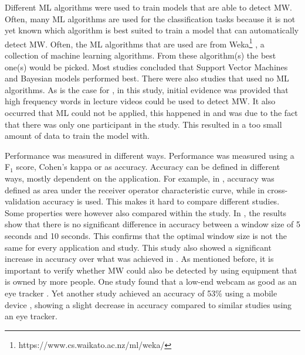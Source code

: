 Different ML algorithms were used to train models that are able to detect MW. Often, many ML algorithms are used for the classification tasks because it is not yet known which algorithm is best suited to train a model that can automatically detect MW. Often, the ML algorithms that are used are from Weka\footnote{https://www.cs.waikato.ac.nz/ml/weka/} \cite{Bixler2015AutomaticPhysiology}\cite{Bixler2015AutomaticAwareness}\cite{Bixler2016AutomaticReadingd}\cite{Bixler2014TowardWanderingd}\cite{Blanchard2014AutomatedLearning}\cite{Gwizdka2019ExploringTasks}\cite{Hutt2017OutClassroom}\cite{Pham2015Attentivelearner:Tracking}, a collection of machine learning algorithms. From these algorithm(s) the best one(s) would be picked. Most studies concluded that Support Vector Machines and Bayesian models performed best. There were also studies that used no ML algorithms. As is the case for \cite{Jo2017AMind}, in this study, initial evidence was provided that high frequency words in lecture videos could be used to detect MW. It also occurred that ML could not be applied, this happened in \cite{Gontier2016HowEnvironment} and was due to the fact that there was only one participant in the study. This resulted in a too small amount of data to train the model with.

Performance was measured in different ways. Performance was measured using a F$_1$ score, Cohen's kappa or as accuracy. Accuracy can be defined in different ways, mostly dependent on the application. For example, in \cite{Cheetham2016AutomatedApplication}, accuracy was defined as area under the receiver operator characteristic curve, while in \cite{Mishchenko2015DetectingTespiti} cross-validation accuracy is used. This makes it hard to compare different studies. Some properties were however also compared within the study. In \cite{Gwizdka2019ExploringTasks}, the results show that there is no significant difference in accuracy between a window size of 5 seconds and 10 seconds. This confirms that the optimal window size is not the same for every application and study. This study also showed a significant increase in accuracy over what was achieved in \cite{Bixler2014TowardWanderingd}. As mentioned before, it is important to verify whether MW could also be detected by using equipment that is owned by more people. One study found that a low-end webcam as good as an eye tracker \cite{Zhao2017ScalableApproach}. Yet another study achieved an accuracy of 53\% using a mobile device \cite{ISI:000443429900018}, showing a slight decrease in accuracy compared to similar studies using an eye tracker.